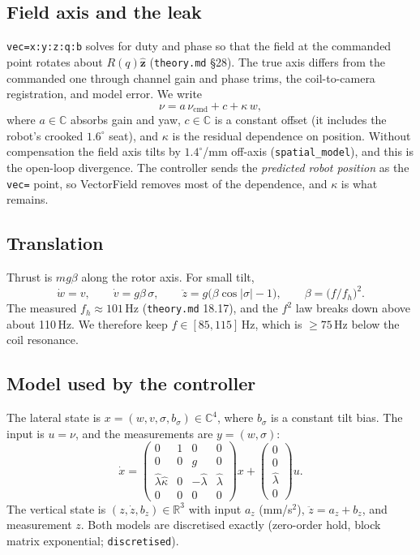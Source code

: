 \documentclass[11pt]{article}
\newcommand{\R}{\mathbb{R}}
\newcommand{\C}{\mathbb{C}}
\newcommand{\uv}[1]{\hat{\mathbf{#1}}}
\begin{document}
\subsection{Field axis and the leak}
\texttt{vec=x:y:z:q:b} solves for duty and phase so that the field at the commanded point rotates
about $R(q)\uv z$ (\texttt{theory.md} \S28). The true axis differs from the commanded one through
channel gain and phase trims, the coil-to-camera registration, and model error. We write
\begin{equation}
\nu=a\,\nu_{\mathrm{cmd}}+c+\kappa\,w,\label{eq:fieldmap}
\end{equation}
where $a\in\C$ absorbs gain and yaw, $c\in\C$ is a constant offset (it includes the robot's crooked
$1.6^\circ$ seat), and $\kappa$ is the residual dependence on position. Without compensation the
field axis tilts by $1.4^\circ$/mm off-axis (\texttt{spatial\_model}), and this is the open-loop
divergence. The controller sends the \emph{predicted robot position} as the \texttt{vec=} point, so
VectorField removes most of the dependence, and $\kappa$ is what remains.

\subsection{Translation}
Thrust is $mg\beta$ along the rotor axis. For small tilt,
\begin{equation}
\dot w=v,\qquad \dot v=g\beta\,\sigma,\qquad \ddot z=g\Big(\beta\cos|\sigma|-1\Big),\qquad
\beta=\big(f/f_h\big)^2 .\label{eq:translation}
\end{equation}
The measured $f_h\approx101$\,Hz (\texttt{theory.md} 18.17), and the $f^2$ law breaks down above
about 110\,Hz. We therefore keep $f\in[85,115]$\,Hz, which is $\ge75$\,Hz below the coil resonance.

\subsection{Model used by the controller}
The lateral state is $x=(w,v,\sigma,b_\sigma)\in\C^4$, where $b_\sigma$ is a constant tilt bias. The
input is $u=\nu$, and the measurements are $y=(w,\sigma)$:
\begin{equation}
\dot x=\begin{pmatrix}0&1&0&0\\0&0&g&0\\ \hat\lambda\hat\kappa&0&-\hat\lambda&\hat\lambda\\0&0&0&0\end{pmatrix}x
+\begin{pmatrix}0\\0\\ \hat\lambda\\0\end{pmatrix}u .\label{eq:lateral}
\end{equation}
The vertical state is $(z,\dot z,b_z)\in\R^3$ with input $a_z$ (mm/s$^2$), $\ddot z=a_z+b_z$, and
measurement $z$. Both models are discretised exactly (zero-order hold, block matrix exponential;
\texttt{discretised}).
\end{document}
